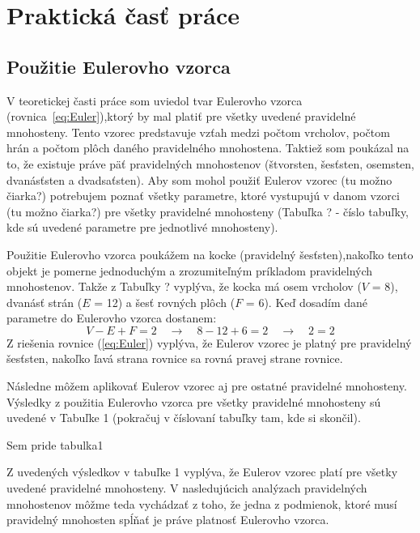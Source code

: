 \documentclass{article}
\begin{document}
	\section{Praktická časť práce}
	\subsection{Použitie Eulerovho vzorca}
	\quad\quad V teoretickej časti práce som uviedol tvar Eulerovho vzorca (rovnica~\ref{eq:Euler}),ktorý by mal platiť pre všetky uvedené pravidelné mnohosteny. Tento vzorec predstavuje vzťah medzi počtom vrcholov, počtom hrán a počtom plôch daného pravidelného mnohostena. Taktiež som poukázal na to, že existuje práve päť pravidelných mnohostenov (štvorsten, šesťsten, osemsten, dvanásťsten a dvadsaťsten). Aby som mohol použiť Eulerov vzorec ({\color{red}tu možno čiarka?}) potrebujem poznať všetky parametre, ktoré vystupujú v danom vzorci ({\color{red}tu možno čiarka?}) pre všetky pravidelné mnohosteny (Tabuľka ? - {\color{red}číslo tabuľky, kde sú uvedené parametre pre jednotlivé mnohosteny}). 
	
	Použitie Eulerovho vzorca poukážem na kocke (pravidelný šesťsten),nakoľko tento objekt je pomerne jednoduchým a zrozumiteľným príkladom pravidelných mnohostenov. Takže z Tabuľky {\color{red}?} vyplýva, že kocka má osem vrcholov ($V$ = 8), dvanásť strán ($E$ = 12) a šesť rovných plôch ($F$ = 6). Keď dosadím dané parametre do Eulerovho vzorca dostanem: 
	\begin{equation}
	V-E+F=2 \quad \rightarrow \quad 8-12+6=2 \quad \rightarrow \quad 2=2
	\label{eq:Euler}
	\end{equation}
	Z riešenia rovnice (\ref{eq:Euler}) vyplýva, že Eulerov vzorec je platný pre pravidelný šesťsten, nakoľko ľavá strana rovnice sa rovná pravej strane rovnice.
	
	Následne môžem aplikovať Eulerov vzorec aj pre ostatné pravidelné mnohosteny. Výsledky z použitia Eulerovho vzorca pre všetky pravidelné mnohosteny sú uvedené v Tabuľke 1 ({\color{red}pokračuj v číslovaní tabuľky tam, kde si skončil}).
	
	
	Sem pride tabulka1
	
	\noindent
	Z uvedených výsledkov v tabuľke 1 vyplýva, že Eulerov vzorec platí pre všetky uvedené pravidelné mnohosteny. V nasledujúcich analýzach pravidelných mnohostenov môžme teda vychádzať z toho, že jedna z podmienok, ktoré musí pravidelný mnohosten spĺňať je práve platnosť Eulerovho vzorca.
	
	
	
	
	
\end{document}
